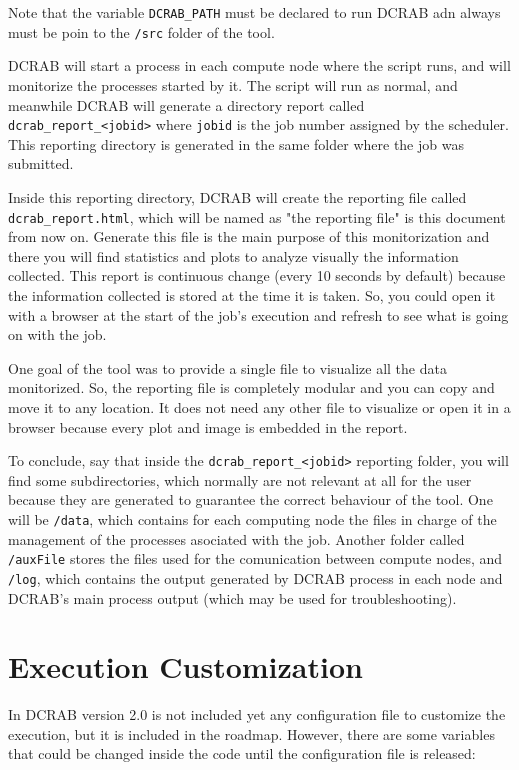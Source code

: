 \documentclass[10pt,a4paper]{report}
\begin{document}
Note that the variable \verb+DCRAB_PATH+ must be declared to run DCRAB adn always must be poin to the \verb+/src+ folder of the tool.

DCRAB will start a process in each compute node where the script runs, and will monitorize the processes started by it. The script will run as normal, and meanwhile DCRAB will generate a directory report called \verb+dcrab_report_<jobid>+ where \verb+jobid+ is the job number assigned by the scheduler. This reporting directory is generated in the same folder where the job was submitted.

\sloppy Inside this reporting directory, DCRAB will create the reporting file called \verb+dcrab_report.html+, which will be named as "the reporting file" is this document from now on. Generate this file is the main purpose of this monitorization and there you will find statistics and plots to analyze visually the information collected. This report is continuous change (every 10 seconds by default) because the information collected is stored at the time it is taken. So, you could open it with a browser at the start of the job's execution and refresh to see what is going on with the job.

One goal of the tool was to provide a single file to visualize all the data monitorized. So, the reporting file is completely modular and you can copy and move it to any location. It does not need any other file to visualize or open it in a browser because every plot and image is embedded in the report.

To conclude, say that inside the \verb+dcrab_report_<jobid>+ reporting folder, you will find some subdirectories, which normally are not relevant at all for the user because they are generated to guarantee the correct behaviour of the tool. One will be \verb+/data+, which contains for each computing node the files in charge of the management of the processes asociated with the job. Another folder called \verb+/auxFile+ stores the files used for the comunication between compute nodes, and \verb+/log+, which contains the output generated by DCRAB process in each node and DCRAB's main process output (which may be used for troubleshooting).

\section{Execution Customization}

In DCRAB version 2.0 is not included yet any configuration file to customize the execution, but it is included in the roadmap. However, there are some variables that could be changed inside the code until the configuration file is released:
\end{document}

